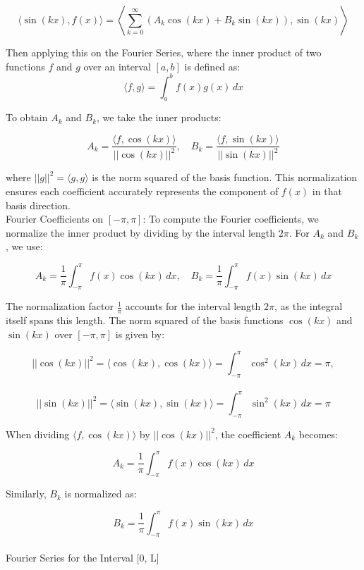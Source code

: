 \documentclass{article}
\begin{document}
\begin{itemize}
{\[
\langle \sin(kx), f(x) \rangle = \left\langle \sum_{k=0}^\infty \left(A_k \cos(kx) + B_k \sin(kx)\right), \sin(kx) \right\rangle
\]

Then applying this on the Fourier Series, where the inner product of two functions \( f \) and \( g \) over an interval \([a, b]\) is defined as:
    \[
    \langle f, g \rangle = \int_{a}^{b} f(x) g(x) \, dx
    \]

    To obtain \( A_k \) and \( B_k \), we take the inner products:

    \[
    A_k = \frac{\langle f, \cos(kx) \rangle}{||\cos(kx)||^2}, \quad B_k = \frac{\langle f, \sin(kx) \rangle}{||\sin(kx)||^2}
    \]

    where \( ||g||^2 = \langle g, g \rangle \) is the norm squared of the basis function.  
    This normalization ensures each coefficient accurately represents the component of \( f(x) \) in that basis direction.\\

    Fourier Coefficients on \([- \pi, \pi]\):
    To compute the Fourier coefficients, we normalize the inner product by dividing by the interval length \( 2\pi \).  
    For \( A_k \) and \( B_k \), we use:

    \[
    A_k = \frac{1}{\pi} \int_{-\pi}^{\pi} f(x) \cos(kx) \, dx, \quad 
    B_k = \frac{1}{\pi} \int_{-\pi}^{\pi} f(x) \sin(kx) \, dx
    \]

    The normalization factor \( \frac{1}{\pi} \) accounts for the interval length \( 2\pi \), as the integral itself spans this length.  
    The norm squared of the basis functions \( \cos(kx) \) and \( \sin(kx) \) over \([- \pi, \pi]\) is given by:

    \[
    ||\cos(kx)||^2 = \langle \cos(kx), \cos(kx) \rangle = \int_{-\pi}^\pi \cos^2(kx) \, dx = \pi,\] \\
    \[
    ||\sin(kx)||^2 = \langle \sin(kx), \sin(kx) \rangle = \int_{-\pi}^\pi \sin^2(kx) \, dx = \pi
    \]

    When dividing \( \langle f, \cos(kx) \rangle \) by \( ||\cos(kx)||^2 \), the coefficient \( A_k \) becomes:

    \[
    A_k = \frac{1}{\pi} \int_{-\pi}^\pi f(x) \cos(kx) \, dx
    \]

    Similarly, \( B_k \) is normalized as:

    \[
    B_k = \frac{1}{\pi} \int_{-\pi}^\pi f(x) \sin(kx) \, dx
    \]\\
    
    Fourier Series for the Interval [0, L]

}
\end{itemize}
\end{document}
